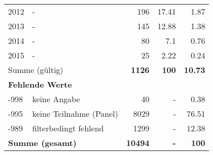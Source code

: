 \begin{longtable}{lXrrr}
     2012 &
     \multicolumn{1}{X}{ -  } &


       \num{196} &
       \num[round-mode=places,round-precision=2]{17.41} &
         \num[round-mode=places,round-precision=2]{1.87} \\

     2013 &
     \multicolumn{1}{X}{ -  } &


       \num{145} &
       \num[round-mode=places,round-precision=2]{12.88} &
         \num[round-mode=places,round-precision=2]{1.38} \\

     2014 &
     \multicolumn{1}{X}{ -  } &


       \num{80} &
       \num[round-mode=places,round-precision=2]{7.1} &
         \num[round-mode=places,round-precision=2]{0.76} \\

     2015 &
     \multicolumn{1}{X}{ -  } &


       \num{25} &
       \num[round-mode=places,round-precision=2]{2.22} &
         \num[round-mode=places,round-precision=2]{0.24} \\
     \midrule
     \multicolumn{2}{l}{Summe (gültig)} &
       \textbf{\num{1126}} &
     \textbf{\num{100}} &
       \textbf{\num[round-mode=places,round-precision=2]{10.73}} \\
     \multicolumn{5}{l}{\textbf{Fehlende Werte}}\\
       -998 &
       keine Angabe &
         \num{40} &
        - &
         \num[round-mode=places,round-precision=2]{0.38} \\
       -995 &
       keine Teilnahme (Panel) &
         \num{8029} &
        - &
         \num[round-mode=places,round-precision=2]{76.51} \\
       -989 &
       filterbedingt fehlend &
         \num{1299} &
        - &
         \num[round-mode=places,round-precision=2]{12.38} \\
     \midrule
     \multicolumn{2}{l}{\textbf{Summe (gesamt)}} &
          \textbf{\num{10494}} &
        \textbf{-} &
        \textbf{\num{100}} \\
     \bottomrule
     \end{longtable}
     
